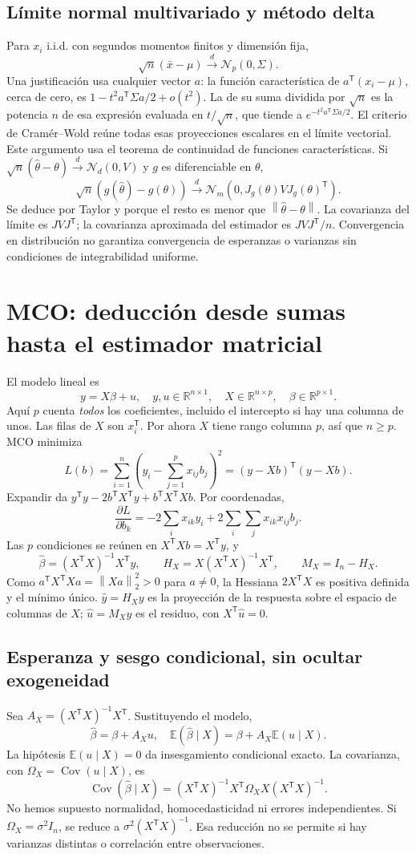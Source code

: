 \documentclass[11pt,a4paper]{article}
\newcommand{\R}{\mathbb R}
\newcommand{\E}{\mathbb E}
\newcommand{\T}{^{\mathsf T}}
\newcommand{\norm}[1]{\left\lVert #1\right\rVert}
\DeclareMathOperator{\Cov}{Cov}
\theoremstyle{definition}
\begin{document}
\subsection{Límite normal multivariado y método delta}
Para $x_i$ i.i.d. con segundos momentos finitos y dimensión fija,
\[
\sqrt n(\bar x-\mu)\xrightarrow{d}\mathcal N_p(0,\Sigma).
\]
Una justificación usa cualquier vector $a$: la función característica de $a\T(x_i-\mu)$, cerca de cero, es $1-t^2a\T\Sigma a/2+o(t^2)$. La de su suma dividida por $\sqrt n$ es la potencia $n$ de esa expresión evaluada en $t/\sqrt n$, que tiende a $e^{-t^2a\T\Sigma a/2}$. El criterio de Cramér--Wold reúne todas esas proyecciones escalares en el límite vectorial. Este argumento usa el teorema de continuidad de funciones características.
Si $\sqrt n(\widehat\theta-\theta)\xrightarrow d\mathcal N_d(0,V)$ y $g$ es diferenciable en $\theta$,
\[
\sqrt n(g(\widehat\theta)-g(\theta))\xrightarrow d
\mathcal N_m(0,J_g(\theta)VJ_g(\theta)\T).
\]
Se deduce por Taylor y porque el resto es menor que $\norm{\widehat\theta-\theta}$. La covarianza del límite es $JVJ\T$; la covarianza aproximada del estimador es $JVJ\T/n$. Convergencia en distribución no garantiza convergencia de esperanzas o varianzas sin condiciones de integrabilidad uniforme.

\section{MCO: deducción desde sumas hasta el estimador matricial}
El modelo lineal es
\[
y=X\beta+u,\quad y,u\in\R^{n\times1},\quad X\in\R^{n\times p},\quad\beta\in\R^{p\times1}.
\]
Aquí $p$ cuenta \emph{todos} los coeficientes, incluido el intercepto si hay una columna de unos. Las filas de $X$ son $x_i\T$. Por ahora $X$ tiene rango columna $p$, así que $n\ge p$. MCO minimiza
\[
L(b)=\sum_{i=1}^n\left(y_i-\sum_{j=1}^px_{ij}b_j\right)^2
=(y-Xb)\T(y-Xb).
\]
Expandir da $y\T y-2b\T X\T y+b\T X\T Xb$. Por coordenadas,
\[
\frac{\partial L}{\partial b_k}=-2\sum_i x_{ik}y_i
+2\sum_i\sum_jx_{ik}x_{ij}b_j.
\]
Las $p$ condiciones se reúnen en $X\T Xb=X\T y$, y
\[
\boxed{\widehat\beta=(X\T X)^{-1}X\T y},\qquad
H_X=X(X\T X)^{-1}X\T,\qquad M_X=I_n-H_X.
\]
Como $a\T X\T Xa=\norm{Xa}_2^2>0$ para $a\ne0$, la Hessiana $2X\T X$ es positiva definida y el mínimo único. $\widehat y=H_Xy$ es la proyección de la respuesta sobre el espacio de columnas de $X$; $\widehat u=M_Xy$ es el residuo, con $X\T\widehat u=0$.
\subsection{Esperanza y sesgo condicional, sin ocultar exogeneidad}
Sea $A_X=(X\T X)^{-1}X\T$. Sustituyendo el modelo,
\[
\widehat\beta=\beta+A_Xu,
\quad\E(\widehat\beta\mid X)=\beta+A_X\E(u\mid X).
\]
La hipótesis $\E(u\mid X)=0$ da insesgamiento condicional exacto. La covarianza, con $\Omega_X=\Cov(u\mid X)$, es
\[
\boxed{\Cov(\widehat\beta\mid X)=
(X\T X)^{-1}X\T\Omega_X X(X\T X)^{-1}}.
\]
No hemos supuesto normalidad, homocedasticidad ni errores independientes. Si $\Omega_X=\sigma^2I_n$, se reduce a $\sigma^2(X\T X)^{-1}$. Esa reducción no se permite si hay varianzas distintas o correlación entre observaciones.
\end{document}
